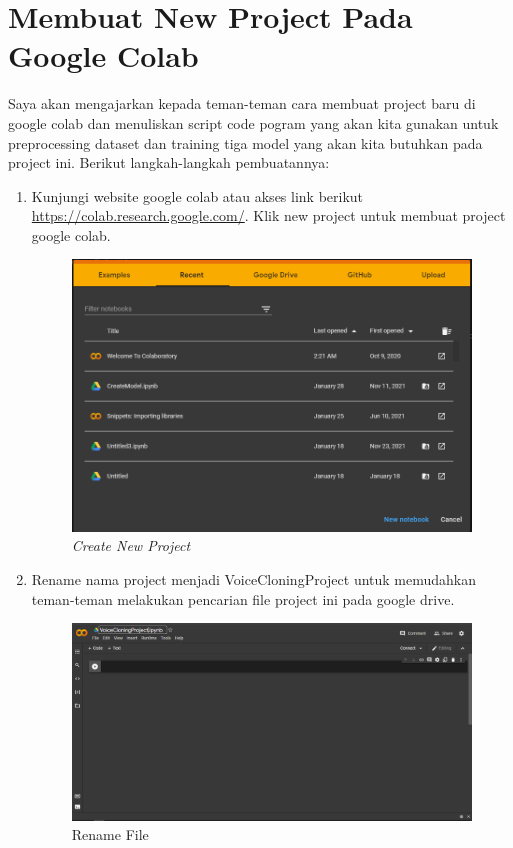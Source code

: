 \section{Membuat New Project Pada Google Colab}
Saya akan mengajarkan kepada teman-teman cara membuat project baru di google colab dan menuliskan script code pogram yang akan kita gunakan untuk preprocessing dataset dan training tiga model yang akan kita butuhkan pada project ini. Berikut langkah-langkah pembuatannya:

\begin{enumerate}

\item Kunjungi website google colab atau akses link berikut \url{https://colab.research.google.com/}. Klik new project untuk membuat project google colab.
\begin{figure}[H]
    \centering
    \includegraphics[scale=0.35]{figures/colab1}
    \caption{\textit{Create New Project}}
    \label{colab1}
\end{figure}

\item Rename nama project menjadi VoiceCloningProject untuk memudahkan teman-teman melakukan pencarian file project ini pada google drive.
\begin{figure}[H]
    \centering
    \includegraphics[scale=0.35]{figures/colab2}
    \caption{Rename File}
    \label{colab2}
\end{figure}


\end{enumerate}
